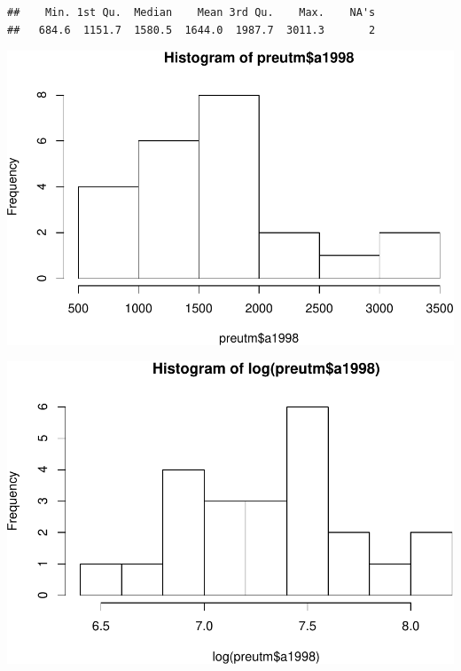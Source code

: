 \documentclass[11pt,]{article}
\newenvironment{Shaded}{\begin{snugshade}}{\end{snugshade}}
\newcommand{\KeywordTok}[1]{\textcolor[rgb]{0.13,0.29,0.53}{\textbf{#1}}}
\newcommand{\OperatorTok}[1]{\textcolor[rgb]{0.81,0.36,0.00}{\textbf{#1}}}
\newcommand{\NormalTok}[1]{#1}
\begin{document}
\begin{verbatim}
##    Min. 1st Qu.  Median    Mean 3rd Qu.    Max.    NA's 
##   684.6  1151.7  1580.5  1644.0  1987.7  3011.3       2
\end{verbatim}

\begin{Shaded}
\end{Shaded}

\includegraphics{proyecto_Superficie_Continua_files/figure-latex/unnamed-chunk-4-1.pdf}

\begin{Shaded}
\end{Shaded}

\includegraphics{proyecto_Superficie_Continua_files/figure-latex/unnamed-chunk-4-2.pdf}
\end{document}
